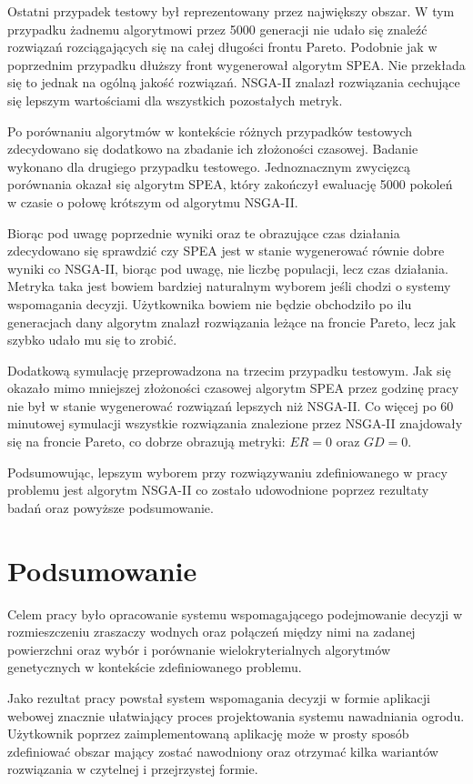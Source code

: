 \documentclass[twoside]{iisthesis}
\begin{document}
Ostatni przypadek testowy był reprezentowany przez największy obszar. W tym przypadku żadnemu algorytmowi przez 5000 generacji nie udało się znaleźć rozwiązań rozciągających się na całej długości frontu Pareto. Podobnie jak w poprzednim przypadku dłuższy front wygenerował algorytm SPEA. Nie przekłada się to jednak na ogólną jakość rozwiązań. NSGA-II znalazł rozwiązania cechujące się lepszym wartościami dla wszystkich pozostałych metryk.

Po porównaniu algorytmów w kontekście różnych przypadków testowych zdecydowano się dodatkowo na zbadanie ich złożoności czasowej. Badanie wykonano dla drugiego przypadku testowego. Jednoznacznym zwycięzcą porównania okazał się algorytm SPEA, który zakończył ewaluację 5000 pokoleń w czasie o połowę krótszym od algorytmu NSGA-II.

Biorąc pod uwagę poprzednie wyniki oraz te obrazujące czas działania zdecydowano się sprawdzić czy SPEA jest w stanie wygenerować równie dobre wyniki co NSGA-II, biorąc pod uwagę, nie liczbę populacji, lecz czas działania. Metryka taka jest bowiem bardziej naturalnym wyborem jeśli chodzi o systemy wspomagania decyzji. Użytkownika bowiem nie będzie obchodziło po ilu generacjach dany algorytm znalazł rozwiązania leżące na froncie Pareto, lecz jak szybko udało mu się to zrobić.

Dodatkową symulację przeprowadzona na trzecim przypadku testowym. Jak się okazało mimo mniejszej złożoności czasowej algorytm SPEA przez godzinę pracy nie był w stanie wygenerować rozwiązań lepszych niż NSGA-II. Co więcej po 60 minutowej symulacji wszystkie rozwiązania znalezione przez NSGA-II znajdowały się na froncie Pareto, co dobrze obrazują metryki: $ER=0$ oraz $GD=0$.

Podsumowując, lepszym wyborem przy rozwiązywaniu zdefiniowanego w pracy problemu jest algorytm NSGA-II co zostało udowodnione poprzez rezultaty badań oraz powyższe podsumowanie.
\chapter{Podsumowanie}
Celem pracy było opracowanie systemu wspomagającego podejmowanie decyzji w rozmieszczeniu zraszaczy wodnych oraz połączeń między nimi na zadanej powierzchni oraz wybór i porównanie wielokryterialnych algorytmów genetycznych w kontekście zdefiniowanego problemu.

Jako rezultat pracy powstał system wspomagania decyzji w formie aplikacji webowej znacznie ułatwiający proces projektowania systemu nawadniania ogrodu. Użytkownik poprzez zaimplementowaną aplikację może w prosty sposób zdefiniować obszar mający zostać nawodniony oraz otrzymać kilka wariantów rozwiązania w czytelnej i przejrzystej formie.
\end{document}
